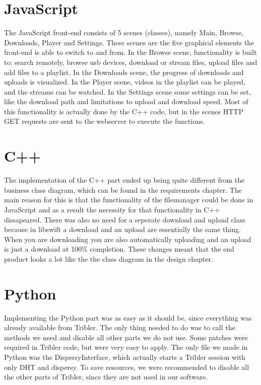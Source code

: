 \section{JavaScript}
The JavaScript front-end consists of 5 scenes (classes), namely Main, Browse, Downloads, Player and Settings.
These scenes are the five graphical elements the front-end is able to switch to and from.
In the Browse scene, functionality is built to: search remotely, browse usb devices, download or stream files,
upload files and add files to a playlist. In the Downloads scene, the progress of downloads and uploads is visualized.
In the Player scene, videos in the playlist can be played, and the streams can be watched.
In the Settings scene some settings can be set, like the download path and limitations to upload and download speed.
Most of this functionality is actually done by the C++ code, but in the scenes HTTP GET requests are sent to the webserver to execute the functions.

\section{C++}
The implementation of the C++ part ended up being quite different from the business class diagram, which can be found in the requirements chapter. The main reason for this is that the functionality of the filemanager could be done in JavaScript and as a result the necessity for that functionality in C++ dissapeared. There was also no need for a seperate download and upload class because in libswift a download and an upload are essentially the same thing. When you are downloading you are also automatically uploading and an upload is just a download at 100\% completion. These changes meant that the end product looks a lot like the the class diagram in the design chapter.

\section{Python}
Implementing the Python part was as easy as it should be, since everything was already available from Tribler. The only thing needed to do was to call the methods we need and disable all other parts we do not use. 
Some patches were required in Tribler code, but were very easy to apply. The only file we made in Python was the DispersyInterface, which actually starts a Tribler session with only DHT and dispersy. 
To save resources, we were recommended to disable all the other parts of Tribler, since they are not used in our software.

